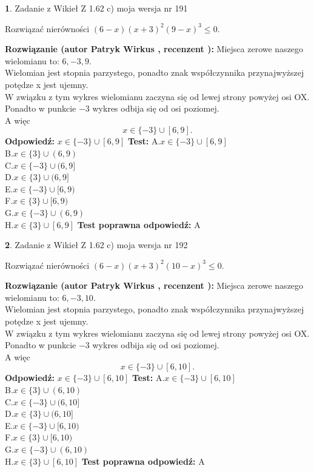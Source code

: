 \documentclass[12pt, a4paper]{article}
\theoremstyle{definition} %
\newtheorem{zad}{}
\newcommand{\zadStart}[1]{\begin{zad}#1\newline}
\newcommand{\zadStop}{\end{zad}}
\newcommand{\rozwStart}[2]{\noindent \textbf{Rozwiązanie (autor #1 , recenzent #2): }\newline}
\newcommand{\rozwStop}{\newline}
\newcommand{\odpStart}{\noindent \textbf{Odpowiedź:}\newline}
\newcommand{\odpStop}{\newline}
\newcommand{\testStart}{\noindent \textbf{Test:}\newline}
\newcommand{\testStop}{\newline}
\newcommand{\kluczStart}{\noindent \textbf{Test poprawna odpowiedź:}\newline}
\newcommand{\kluczStop}{\newline}
\begin{document}
\zadStart{Zadanie z Wikieł Z 1.62 c) moja wersja nr 191}

Rozwiązać nierówności $(6-x)(x+3)^{2}(9-x)^{3}\le0$.
\zadStop
\rozwStart{Patryk Wirkus}{}
Miejsca zerowe naszego wielomianu to: $6, -3, 9$.\\
Wielomian jest stopnia parzystego, ponadto znak współczynnika przy\linebreak najwyższej potędze x jest ujemny.\\ W związku z tym wykres wielomianu zaczyna się od lewej strony powyżej osi OX.\\
Ponadto w punkcie $-3$ wykres odbija się od osi poziomej.\\
A więc $$x \in \{-3\} \cup [6,9].$$
\rozwStop
\odpStart
$x \in \{-3\} \cup [6,9]$
\odpStop
\testStart
A.$x \in \{-3\} \cup [6,9]$\\
B.$x \in \{3\} \cup (6,9)$\\
C.$x \in \{-3\} \cup (6,9]$\\
D.$x \in \{3\} \cup (6,9]$\\
E.$x \in \{-3\} \cup [6,9)$\\
F.$x \in \{3\} \cup [6,9)$\\
G.$x \in \{-3\} \cup (6,9)$\\
H.$x \in \{3\} \cup [6,9]$
\testStop
\kluczStart
A
\kluczStop



\zadStart{Zadanie z Wikieł Z 1.62 c) moja wersja nr 192}

Rozwiązać nierówności $(6-x)(x+3)^{2}(10-x)^{3}\le0$.
\zadStop
\rozwStart{Patryk Wirkus}{}
Miejsca zerowe naszego wielomianu to: $6, -3, 10$.\\
Wielomian jest stopnia parzystego, ponadto znak współczynnika przy\linebreak najwyższej potędze x jest ujemny.\\ W związku z tym wykres wielomianu zaczyna się od lewej strony powyżej osi OX.\\
Ponadto w punkcie $-3$ wykres odbija się od osi poziomej.\\
A więc $$x \in \{-3\} \cup [6,10].$$
\rozwStop
\odpStart
$x \in \{-3\} \cup [6,10]$
\odpStop
\testStart
A.$x \in \{-3\} \cup [6,10]$\\
B.$x \in \{3\} \cup (6,10)$\\
C.$x \in \{-3\} \cup (6,10]$\\
D.$x \in \{3\} \cup (6,10]$\\
E.$x \in \{-3\} \cup [6,10)$\\
F.$x \in \{3\} \cup [6,10)$\\
G.$x \in \{-3\} \cup (6,10)$\\
H.$x \in \{3\} \cup [6,10]$
\testStop
\kluczStart
A
\kluczStop
\end{document}
